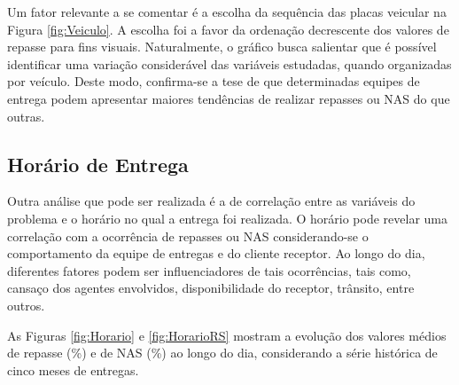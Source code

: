 Um fator relevante a se comentar é a escolha da sequência das placas veicular na Figura \ref{fig:Veiculo}. A escolha foi a favor da ordenação decrescente dos valores de repasse para fins visuais. Naturalmente, o gráfico busca salientar que é possível identificar uma variação considerável das variáveis estudadas, quando organizadas por veículo. Deste modo, confirma-se a tese de que determinadas equipes de entrega podem apresentar maiores tendências de realizar repasses ou NAS do que outras.

\subsection{Horário de Entrega}

Outra análise que pode ser realizada é a de correlação entre as variáveis do problema e o horário no qual a entrega foi realizada.
O horário pode revelar uma correlação com a ocorrência de repasses ou NAS considerando-se o comportamento da equipe de entregas e do cliente receptor. 
Ao longo do dia, diferentes fatores podem ser influenciadores de tais ocorrências, tais como, cansaço dos agentes envolvidos, disponibilidade do receptor, trânsito, entre outros.

As Figuras \ref{fig:Horario} e \ref{fig:HorarioRS} mostram a evolução dos valores médios de repasse (\%) e de NAS (\%) ao longo do dia, considerando a série histórica de cinco meses de entregas.

